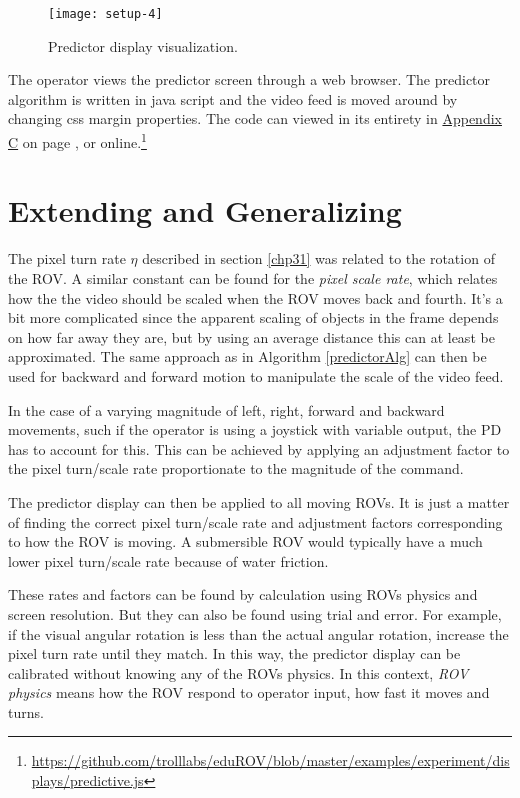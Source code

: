 \begin{figure}[h!]
    \centering
    \texttt{[image: setup-4]}
    \caption{Predictor display visualization.}
    \label{predictorvis}
\end{figure}

\clearpage
\restoregeometry

The operator views the predictor screen through a web browser. The predictor algorithm is written in java script and the video feed is moved around by changing css margin properties. The code can viewed in its entirety in \hyperref[appPredict]{Appendix C} on page \pageref{appPredict}, or online.\footnote{\url{https://github.com/trolllabs/eduROV/blob/master/examples/experiment/displays/predictive.js}}


\section{Extending and Generalizing}\label{expand}

The pixel turn rate $\eta$ described in section \ref{chp31} was related to the rotation of the ROV. A similar constant can be found for the \emph{pixel scale rate}, which relates how the the video should be scaled when the ROV moves back and fourth. It's a bit more complicated since the apparent scaling of objects in the frame depends on how far away they are, but by using an average distance this can at least be approximated. The same approach as in Algorithm \ref{predictorAlg} can then be used for backward and forward motion to manipulate the scale of the video feed.

In the case of a varying magnitude of left, right, forward and backward movements, such if the operator is using a joystick with variable output, the PD has to account for this. This can be achieved by applying an adjustment factor to the pixel turn/scale rate proportionate to the magnitude of the command.

The predictor display can then be applied to all moving ROVs. It is just a matter of finding the correct pixel turn/scale rate and adjustment factors corresponding to how the ROV is moving. A submersible ROV would typically have a much lower pixel turn/scale rate because of water friction.

These rates and factors can be found by calculation using ROVs physics and screen resolution. But they can also be found using trial and error. For example, if the visual angular rotation is less than the actual angular rotation, increase the pixel turn rate until they match. In this way, the predictor display can be calibrated without knowing any of the ROVs physics. In this context, \emph{ROV physics} means how the ROV respond to operator input, how fast it moves and turns.